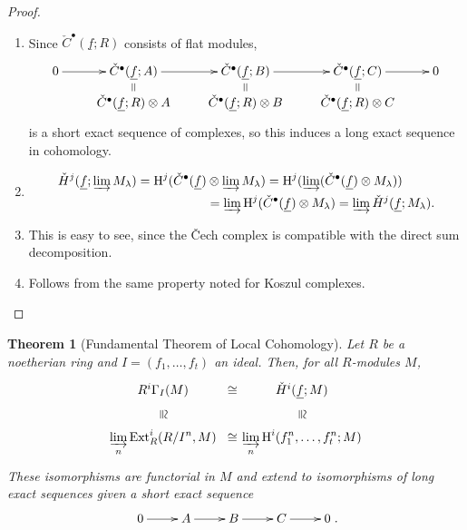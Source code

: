 \documentclass[11pt]{book}
\newtheorem{theorem}{Theorem}[chapter]
\numberwithin{equation}{section}
\numberwithin{theorem}{chapter}
\theoremstyle{definition}
\newtheorem*{basic properties}{Basic Properties}
\newtheorem*{Important Remark}{Important Remark}
\theoremstyle{remark}
\newcommand{\Ext}{\operatorname{Ext}}
\renewcommand{\H}{\operatorname{H}}
\begin{document}
\begin{proof}
	$\,$
	\begin{enumerate}[(1)]
		\item Since $\check{C}^\bullet(\underline{f};R)$ consists of flat modules,
		$$\xymatrix@R=2mm{0 \ar[r] & \check{C}^\bullet(\underline{f};A) \ar[r] & \check{C}^\bullet(\underline{f};B) \ar[r] & \check{C}^\bullet(\underline{f};C) \ar[r] & 0 \\ &
		\check{C}^\bullet(\underline{f};R) \otimes A \ar@{=}[u] & \check{C}^\bullet(\underline{f};R) \otimes B \ar@{=}[u] & \check{C}^\bullet(\underline{f};R) \otimes C \ar@{=}[u]}$$
		is a short exact sequence of complexes, so this induces a long exact sequence in cohomology.
		
		\item \begin{align*} \check{H}^j(\underline{f};  \varinjlim M_\lambda) = \H^j(\check{C}^\bullet(\underline{f}) &\otimes \varinjlim M_\lambda ) = \H^j(\varinjlim (\check{C}^\bullet(\underline{f})\otimes  M_\lambda)) \\
		&=\varinjlim \H^j( \check{C}^\bullet(\underline{f})\otimes  M_\lambda)  
		=\varinjlim \check{H}^j(\underline{f};  M_\lambda).\end{align*}
		\item This is easy to see, since the \v{C}ech complex is compatible with the direct sum decomposition.
		\item Follows from the same property noted for Koszul complexes.\qedhere
	\end{enumerate}
\end{proof}


\begin{theorem}[Fundamental Theorem of Local Cohomology]
	Let $R$ be a noetherian ring and $I = (f_1, \ldots, f_t)$ an ideal. Then, for all $R$-modules $M$,
	$$\xymatrix@R=5mm@C=5mm{R^i\Gamma_I(M)  \ar@{}[r]|*=0[@]{\cong}  \ar@{}[d]|*=0[@]{\cong} & \check{H}^i(\underline{f};M)  \ar@{}[d]|*=0[@]{\cong} \\ 
	\displaystyle\varinjlim_n \Ext^i_R(R/I^n,M)  \ar@{}[r]|*=0[@]{\cong} & \displaystyle\varinjlim_n \H^i (f_1^n, \ldots, f_t^n;M)}$$
	These isomorphisms are functorial in $M$ and extend to isomorphisms of long exact sequences given a short exact sequence
	$$\xymatrix{0 \ar[r] & A \ar[r] & B \ar[r] & C \ar[r] & 0}.$$
\end{theorem}
\end{document}

